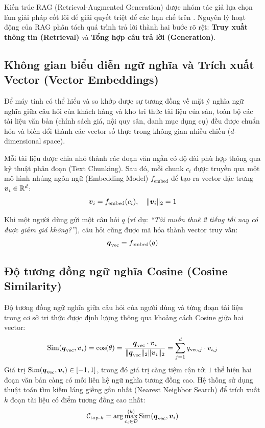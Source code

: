Kiến trúc RAG (Retrieval-Augmented Generation) được nhóm tác giả lựa chọn làm giải pháp cốt lõi để giải quyết triệt để các hạn chế trên \cite{lewis2020rag}. Nguyên lý hoạt động của RAG phân tách quá trình trả lời thành hai bước rõ rệt: \textbf{Truy xuất thông tin (Retrieval)} và \textbf{Tổng hợp câu trả lời (Generation)}.

\subsection{Không gian biểu diễn ngữ nghĩa và Trích xuất Vector (Vector Embeddings)}
Để máy tính có thể hiểu và so khớp được sự tương đồng về mặt ý nghĩa ngữ nghĩa giữa câu hỏi của khách hàng và kho tri thức tài liệu của sân, toàn bộ các tài liệu văn bản (chính sách giá, nội quy sân, danh mục dụng cụ) đều được chuẩn hóa và biến đổi thành các vector số thực trong không gian nhiều chiều ($d$-dimensional space).

Mỗi tài liệu được chia nhỏ thành các đoạn văn ngắn có độ dài phù hợp thông qua kỹ thuật phân đoạn (Text Chunking). Sau đó, mỗi chunk $c_i$ được truyền qua một mô hình nhúng ngôn ngữ (Embedding Model) $f_{\text{embed}}$ để tạo ra vector đặc trưng $\boldsymbol{v}_i \in \mathbb{R}^d$:
\begin{equation}
    \boldsymbol{v}_i = f_{\text{embed}}(c_i), \quad \|\boldsymbol{v}_i\|_2 = 1
\end{equation}

Khi một người dùng gửi một câu hỏi $q$ (ví dụ: \textit{``Tôi muốn thuê 2 tiếng tối nay có được giảm giá không?''}), câu hỏi cũng được mã hóa thành vector truy vấn:
\begin{equation}
    \boldsymbol{q}_{\text{vec}} = f_{\text{embed}}(q)
\end{equation}

\subsection{Độ tương đồng ngữ nghĩa Cosine (Cosine Similarity)}
Độ tương đồng ngữ nghĩa giữa câu hỏi của người dùng và từng đoạn tài liệu trong cơ sở tri thức được định lượng thông qua khoảng cách Cosine giữa hai vector:
\begin{equation}
    \text{Sim}(\boldsymbol{q}_{\text{vec}}, \boldsymbol{v}_i) = \cos(\theta) = \frac{\boldsymbol{q}_{\text{vec}} \cdot \boldsymbol{v}_i}{\|\boldsymbol{q}_{\text{vec}}\|_2 \|\boldsymbol{v}_i\|_2} = \sum_{j=1}^{d} q_{\text{vec}, j} \cdot v_{i, j}
    \label{eq:cosine_formula}
\end{equation}
Giá trị $\text{Sim}(\boldsymbol{q}_{\text{vec}}, \boldsymbol{v}_i) \in [-1, 1]$, trong đó giá trị càng tiệm cận tới $1$ thể hiện hai đoạn văn bản càng có mối liên hệ ngữ nghĩa tương đồng cao. Hệ thống sử dụng thuật toán tìm kiếm láng giềng gần nhất (Nearest Neighbor Search) để trích xuất $k$ đoạn tài liệu có điểm tương đồng cao nhất:
\begin{equation}
    \mathcal{C}_{\text{top-}k} = \arg\max_{c_i \in \mathcal{D}}^{(k)} \text{Sim}(\boldsymbol{q}_{\text{vec}}, \boldsymbol{v}_i)
\end{equation}

